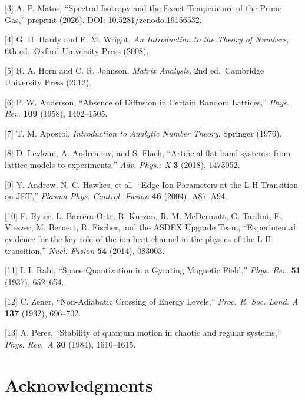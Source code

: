 \documentclass[11pt,letterpaper]{article}
\theoremstyle{definition}
\theoremstyle{remark}
\begin{document}
[3] A. P. Matos, ``Spectral Isotropy and the Exact Temperature of the Prime Gas,'' preprint (2026). DOI: \href{https://doi.org/10.5281/zenodo.19156532}{10.5281/zenodo.19156532}.

[4] G. H. Hardy and E. M. Wright, \emph{An Introduction to the Theory of Numbers}, 6th ed.~Oxford University Press (2008).

[5] R. A. Horn and C. R. Johnson, \emph{Matrix Analysis}, 2nd ed.~Cambridge University Press (2012).

[6] P. W. Anderson, ``Absence of Diffusion in Certain Random Lattices,'' \emph{Phys. Rev.} \textbf{109} (1958), 1492--1505.

[7] T. M. Apostol, \emph{Introduction to Analytic Number Theory}. Springer (1976).

[8] D. Leykam, A. Andreanov, and S. Flach, ``Artificial flat band systems: from lattice models to experiments,'' \emph{Adv. Phys.: X} \textbf{3} (2018), 1473052.

[9] Y. Andrew, N. C. Hawkes, et al.~``Edge Ion Parameters at the L-H Transition on JET,'' \emph{Plasma Phys. Control. Fusion} \textbf{46} (2004), A87--A94.

[10] F. Ryter, L. Barrera Orte, B. Kurzan, R. M. McDermott, G. Tardini, E. Viezzer, M. Bernert, R. Fischer, and the ASDEX Upgrade Team, ``Experimental evidence for the key role of the ion heat channel in the physics of the L-H transition,'' \emph{Nucl. Fusion} \textbf{54} (2014), 083003.

[11] I. I. Rabi, ``Space Quantization in a Gyrating Magnetic Field,'' \emph{Phys. Rev.} \textbf{51} (1937), 652--654.

[12] C. Zener, ``Non-Adiabatic Crossing of Energy Levels,'' \emph{Proc. R. Soc. Lond. A} \textbf{137} (1932), 696--702.

[13] A. Peres, ``Stability of quantum motion in chaotic and regular systems,'' \emph{Phys. Rev.~A} \textbf{30} (1984), 1610--1615.

\section*{Acknowledgments}
\end{document}
